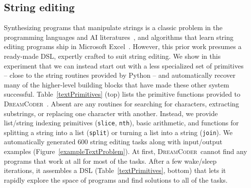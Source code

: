\documentclass{article}
\newcommand{\system}{\textsc{DreamCoder}~}
\newcommand{\code}[1]{{\footnotesize\texttt{#1}}}
\begin{document}


\subsection{String editing}\label{textSection}
Synthesizing programs that manipulate strings is a classic problem in the
programming languages and AI literatures~\cite{menon2013machine,lau2001programming},
and algorithms that learn string editing programs ship in Microsoft Excel~\cite{gulwani2011automating}.
However, this prior work presumes a ready-made DSL,
expertly crafted to suit string editing.
We show in this experiment that we can instead start out with a
less specialized set of primitives -- close to the string routines provided by Python --
and automatically recover many of the higher-level building blocks that have made these
other system successful.
Table~\ref{textPrimitives} (top) lists the primitive functions provided to \system.
Absent are any routines for searching for characters, extracting substrings,
or replacing one character with another.
Instead, we provide list/string indexing primitives (\code{slice}, \code{nth}),
basic arithmetic, and functions for splitting a string into a list (\code{split})
or turning a list into a string (\code{join}).
We automatically generated  600 string editing tasks along with input/output examples (Figure~\ref{exampleTextProblem}). %
At first, \system cannot find any programs that
work at all for most of the tasks.
After a few wake/sleep iterations,
it assembles a DSL (Table~\ref{textPrimitives}, bottom) that lets it rapidly explore the space of programs and find solutions to
all of the tasks.
\end{document}
